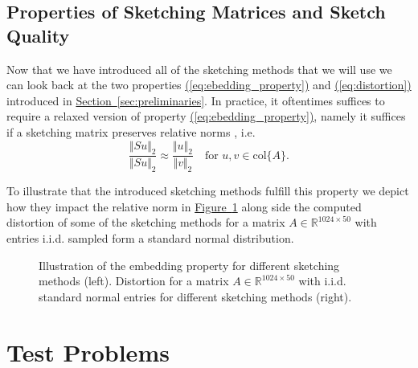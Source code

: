 \documentclass{article}
\begin{document}
\subsection{Properties of Sketching Matrices and Sketch Quality}

Now that we have introduced all of the sketching methods that we will use we can look back at the two properties \hyperref[eq:ebedding_property]{(\ref*{eq:ebedding_property})} and \hyperref[eq:distortion]{(\ref*{eq:distortion})} introduced in \hyperref[sec:preliminaries]{Section~\ref*{sec:preliminaries}}. In practice, it oftentimes suffices to require a relaxed version of property \hyperref[eq:ebedding_property]{(\ref*{eq:ebedding_property})}, namely it suffices if a sketching matrix preserves relative norms \cite{murray2023randomizednumericallinearalgebra}, i.e. 
\begin{equation}
    \frac{\Vert Su\Vert_2}{\Vert Su\Vert_2} \approx \frac{\Vert u\Vert_2}{\Vert v \Vert_2}
    \quad \text{for } u, v \in \mathrm{col}\{A\}.
\end{equation}

To illustrate that the introduced sketching methods fulfill this property we depict how they impact the relative norm in \hyperref[fig:sketch_properties]{Figure~\ref*{fig:sketch_properties}} along side the computed distortion of some of the sketching methods for a matrix $A \in \mathbb{R}^{1024 \times 50}$ with entries i.i.d. sampled form a standard normal distribution.



\begin{figure}[htb]
  \centering
  \begin{minipage}[t]{.49\linewidth}
    \centering
  \end{minipage}
  \begin{minipage}[t]{.49\linewidth}
    \centering
  \end{minipage}
  \caption{Illustration of the embedding property for different sketching methods (left). Distortion for a matrix $A \in \mathbb{R}^{1024 \times 50}$ with i.i.d. standard normal entries for different sketching methods (right).}
  \label{fig:sketch_properties}
\end{figure}


\section{Test Problems}
\end{document}
